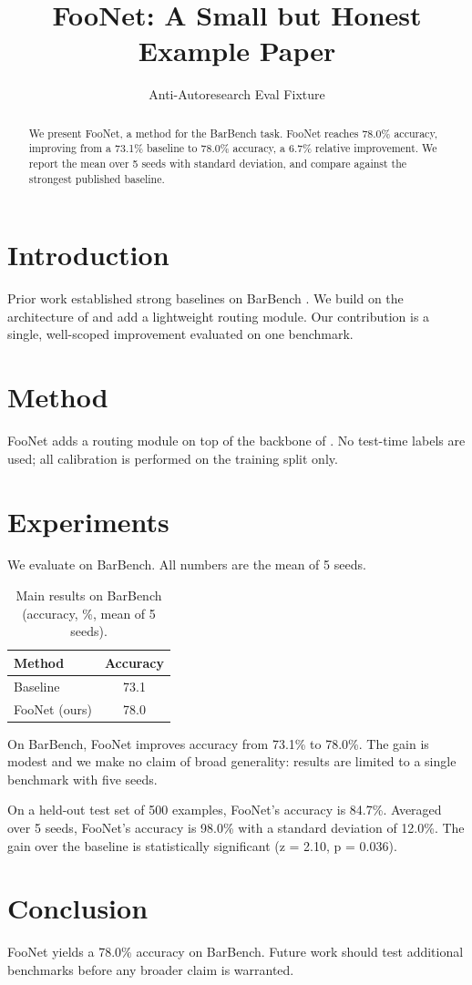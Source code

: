 \documentclass{article}
\title{FooNet: A Small but Honest Example Paper}
\author{Anti-Autoresearch Eval Fixture}
\begin{document}
\maketitle

\begin{abstract}
We present FooNet, a method for the BarBench task. FooNet reaches
78.0\% accuracy, improving from a 73.1\% baseline to 78.0\% accuracy,
a 6.7\% relative improvement. We report the mean over 5 seeds with
standard deviation, and compare against the strongest published baseline.
\end{abstract}

\section{Introduction}
Prior work established strong baselines on BarBench \cite{smith2024bar}.
We build on the architecture of \cite{lee2023foundations} and add a
lightweight routing module. Our contribution is a single, well-scoped
improvement evaluated on one benchmark.

\section{Method}
FooNet adds a routing module on top of the backbone of
\cite{lee2023foundations}. No test-time labels are used; all calibration
is performed on the training split only.

\section{Experiments}
We evaluate on BarBench. All numbers are the mean of 5 seeds.

\begin{table}[t]
\caption{Main results on BarBench (accuracy, \%, mean of 5 seeds).}
\begin{tabular}{lc}
\toprule
Method & Accuracy \\
\midrule
Baseline \cite{smith2024bar} & 73.1 \\
FooNet (ours) & 78.0 \\
\bottomrule
\end{tabular}
\end{table}

On BarBench, FooNet improves accuracy from 73.1\% to 78.0\%. The gain is
modest and we make no claim of broad generality: results are limited to a
single benchmark with five seeds.

On a held-out test set of 500 examples, FooNet's accuracy is 84.7\%.
Averaged over 5 seeds, FooNet's accuracy is 98.0\% with a standard
deviation of 12.0\%. The gain over the baseline is statistically
significant (z = 2.10, p = 0.036).

\section{Conclusion}
FooNet yields a 78.0\% accuracy on BarBench. Future work should test
additional benchmarks before any broader claim is warranted.
\end{document}
